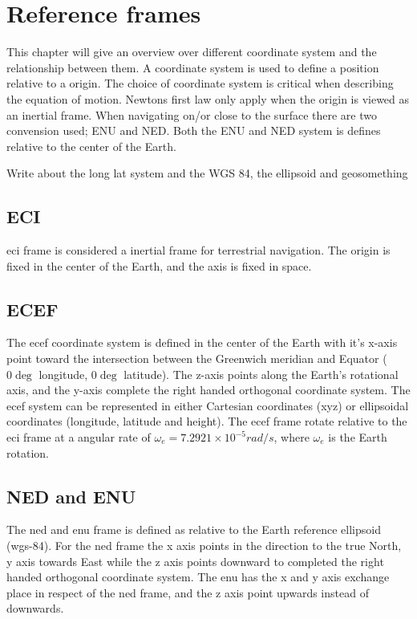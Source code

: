 
\chapter{Reference frames}
This chapter will give an overview over different coordinate system and the relationship between them. A coordinate system is used to define a position relative to a origin. The choice of coordinate system is critical when describing the equation of motion. Newtons first law only apply when the origin is viewed as an inertial frame. When navigating on/or close to the surface there are two convension used; ENU and NED. Both the ENU and NED system is defines relative to the center of the Earth.

Write about the long lat system and the WGS 84, the ellipsoid and geosomething
\section{ECI}
\gls{eci} frame is considered a inertial frame for terrestrial navigation. The origin is fixed in the center of the Earth, and the axis is fixed in space.
\section{ECEF}
The \gls{ecef} coordinate system is defined in the center of the Earth with it's x-axis point toward the intersection between the Greenwich meridian and Equator ( $0\deg $ longitude, $0\deg $ latitude). The z-axis points along the Earth's rotational axis, and the y-axis complete the right handed orthogonal coordinate system. The \gls{ecef} system can be represented in either Cartesian coordinates (xyz) or ellipsoidal coordinates (longitude, latitude and height). The \gls{ecef} frame rotate relative to the \gls{eci} frame at a angular rate of $\omega_e = 7.2921 \times 10^{-5}rad/s$, where $\omega_e$ is the Earth rotation.
\section{NED and ENU}
The \gls{ned} and \gls{enu} frame is defined as relative to the Earth reference ellipsoid (\gls{wgs-84}). For the \gls{ned} frame the x axis points in the direction to the true North, y axis towards East while the z axis points downward to completed the right handed orthogonal coordinate system. The \gls{enu} has the x and y axis exchange place in respect of the \gls{ned} frame, and the z axis point upwards instead of downwards.
\cleardoublepage